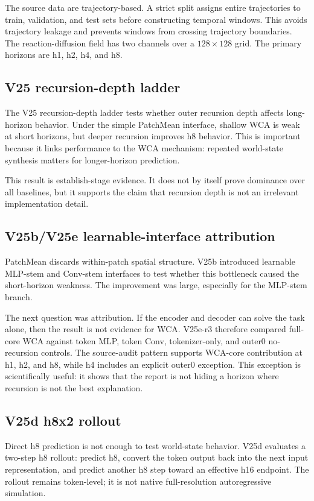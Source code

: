 \documentclass[11pt]{article}
\begin{document}
The source data are trajectory-based. A strict split assigns entire
trajectories to train, validation, and test sets before constructing temporal
windows. This avoids trajectory leakage and prevents windows from crossing
trajectory boundaries. The reaction-diffusion field has two channels over a
$128\times 128$ grid. The primary horizons are h1, h2, h4, and h8.

\subsection{V25 recursion-depth ladder}

The V25 recursion-depth ladder tests whether outer recursion depth affects
long-horizon behavior. Under the simple PatchMean interface, shallow WCA is weak
at short horizons, but deeper recursion improves h8 behavior. This is important
because it links performance to the WCA mechanism: repeated world-state
synthesis matters for longer-horizon prediction.

This result is establish-stage evidence. It does not by itself prove dominance
over all baselines, but it supports the claim that recursion depth is not an
irrelevant implementation detail.

\subsection{V25b/V25e learnable-interface attribution}

PatchMean discards within-patch spatial structure. V25b introduced learnable
MLP-stem and Conv-stem interfaces to test whether this bottleneck caused the
short-horizon weakness. The improvement was large, especially for the MLP-stem
branch.

The next question was attribution. If the encoder and decoder can solve the
task alone, then the result is not evidence for WCA. V25e-r3 therefore compared
full-core WCA against token MLP, token Conv, tokenizer-only, and outer0
no-recursion controls. The source-audit pattern supports WCA-core contribution
at h1, h2, and h8, while h4 includes an explicit outer0 exception. This
exception is scientifically useful: it shows that the report is not hiding a
horizon where recursion is not the best explanation.

\subsection{V25d h8x2 rollout}

Direct h8 prediction is not enough to test world-state behavior. V25d evaluates
a two-step h8 rollout: predict h8, convert the token output back into the next
input representation, and predict another h8 step toward an effective h16
endpoint. The rollout remains token-level; it is not native full-resolution
autoregressive simulation.
\end{document}
